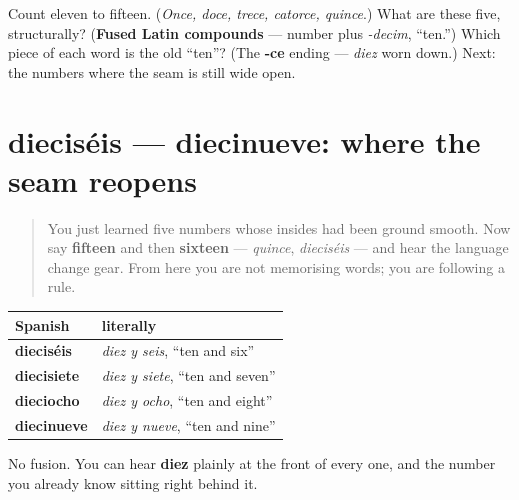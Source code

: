 \begin{tcolorbox}[breakable,colback=teal!4,colframe=teal!35!black,title={Before you move on}]
Count eleven to fifteen. (\emph{Once, doce, trece, catorce, quince}.) What are these five, structurally? (\textbf{Fused Latin compounds} — number plus \emph{-decim}, \textquotedblleft{}ten.\textquotedblright{}) Which piece of each word is the old \textquotedblleft{}ten\textquotedblright{}? (The \textbf{-ce} ending — \emph{diez} worn down.) Next: the numbers where the seam is still wide open.
\end{tcolorbox}
\section[dieciséis — diecinueve]{dieciséis — diecinueve: where the seam reopens}

\label{lesson:ES-C31-dieciseis-diecinueve}



\begin{quote}
You just learned five numbers whose insides had been ground smooth. Now say \textbf{fifteen} and then \textbf{sixteen} — \emph{quince}, \emph{dieciséis} — and hear the language change gear. From here you are not memorising words; you are following a rule.
\end{quote}

\begin{cousinweb}
\noindent
\begin{tabularx}{\linewidth}{@{}>{\raggedright\arraybackslash}X>{\raggedright\arraybackslash}X@{}}
\toprule
\textbf{Spanish} & \textbf{literally} \\
\midrule
\textbf{dieciséis} & \emph{diez y seis}, \textquotedblleft{}ten and six\textquotedblright{} \\
\textbf{diecisiete} & \emph{diez y siete}, \textquotedblleft{}ten and seven\textquotedblright{} \\
\textbf{dieciocho} & \emph{diez y ocho}, \textquotedblleft{}ten and eight\textquotedblright{} \\
\textbf{diecinueve} & \emph{diez y nueve}, \textquotedblleft{}ten and nine\textquotedblright{} \\
\bottomrule
\end{tabularx}

No fusion. You can hear \textbf{diez} plainly at the front of every one, and the number you already know sitting right behind it.
\end{cousinweb}

